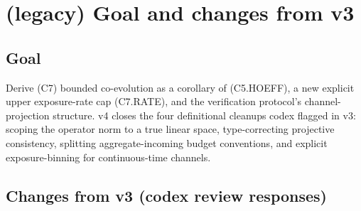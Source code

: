 \documentclass{article}
\begin{document}
\section{(legacy) Goal and changes from v3}

\subsection{Goal}

Derive (C7) bounded co-evolution as a corollary of (C5.HOEFF), a
new explicit upper exposure-rate cap (C7.RATE), and the
verification protocol's channel-projection structure.  v4 closes
the four definitional cleanups codex flagged in v3: scoping the
operator norm to a true linear space, type-correcting projective
consistency, splitting aggregate-incoming budget conventions, and
explicit exposure-binning for continuous-time channels.

\subsection{Changes from v3 (codex review responses)}
\end{document}
